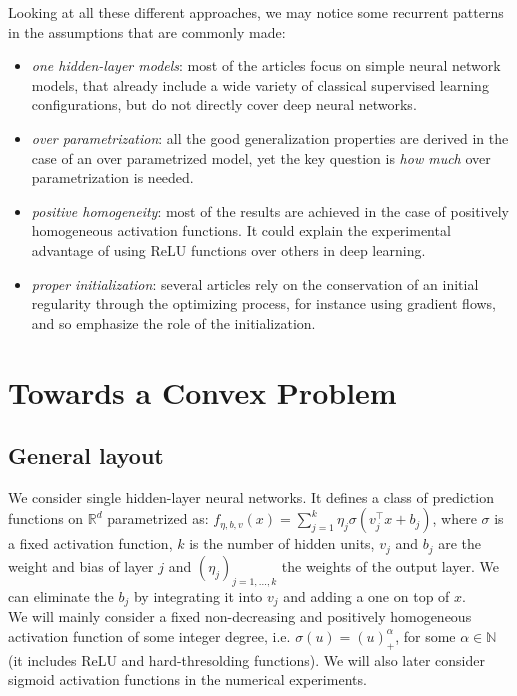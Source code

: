 \documentclass[a4paper, 11pt]{scrartcl}
\begin{document}
Looking at all these different approaches, we may notice some recurrent patterns in the assumptions that are commonly made:

\begin{itemize}
\item \textit{one hidden-layer models}: most of the articles focus on simple neural network models, that already include a wide variety of classical supervised learning configurations, but do not directly cover deep neural networks.
\item \textit{over parametrization}: all the good generalization properties are derived in the case of an over parametrized model, yet the key question is \textit{how much} over parametrization is needed.
\item \textit{positive homogeneity}: most of the results are achieved in the case of positively homogeneous activation functions. It could explain the experimental advantage of using ReLU functions over others in deep learning.
\item \textit{proper initialization}: several articles rely on the conservation of an initial regularity through the optimizing process, for instance using gradient flows, and so emphasize the role of the initialization.
\end{itemize}

\section{Towards a Convex Problem}

\subsection{General layout}

We consider single hidden-layer neural networks. It defines a class of prediction functions on $\mathbb{R}^d$ parametrized as: $f_{\eta, b, v}(x) =\sum_{j=1}^k \eta_j \sigma(v_j^\top x + b_j)$, where $\sigma$ is a fixed activation function, $k$ is the number of hidden units, $v_j$ and $b_j$ are the weight and bias of layer $j$ and $(\eta_j)_{j=1,...,k}$ the weights of the output layer. We can eliminate the $b_j$ by integrating it into $v_j$ and adding a one on top of $x$.\\

We will mainly consider a fixed non-decreasing and positively homogeneous  activation function of some integer degree, i.e. $\sigma(u) = (u)^\alpha_+$, for some $\alpha \in \mathbb{N}$ (it includes ReLU and hard-thresolding functions). We will also later consider sigmoid activation functions in the numerical experiments.
\end{document}
